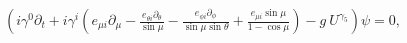 \begin{equation}
\label{Dpolar1}
\left( i \gamma^0 \partial_t + 
i \gamma^i \left(
e_{\mu i} \partial_\mu -
\tfrac{
e_{\theta i} \partial_\theta
}{\sin \mu} 
- 
\tfrac{
e_{\phi i} \partial_\phi
}{\sin \mu \sin \theta} 
+
\tfrac{ 
e_{\mu i} 
\sin \mu}{1 - \cos \mu} 
\right)
- g~U^{\gamma_5} 
\right)
\psi = 0,
\end{equation}

